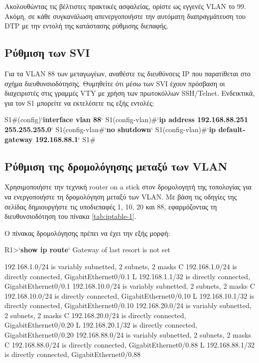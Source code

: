 \documentclass{EdipyLabs} %
\begin{document}
Ακολουθώντας τις βέλτιστες πρακτικές ασφαλείας, ορίστε ως εγγενές VLAN το 99. Ακόμη, σε κάθε συγκανάλωση απενεργοποιήστε την αυτόματη διαπραγμάτευση του DTP με την εντολή  της κατάστασης ρύθμισης διεπαφής.


\subsection{Ρύθμιση των SVI}
Για τα VLAN 88 των μεταγωγέων, αναθέστε τις διευθύνσεις IP που παρατίθεται στο σχήμα διευθυνσιοδότησης. Θυμηθείτε ότι μέσω των SVI έχουν πρόσβαση οι διαχειριστές στις γραμμές VTY με χρήση των πρωτοκόλλων SSH/Telnet. Ενδεικτικά, για τον S1 μπορείτε να εκτελέσετε τις εξής εντολές:

\begin{CommandBox}
S1#(config)`\textbf{interface vlan 88}`
S1(config-vlan)#`\textbf{ip address 192.168.88.251 255.255.255.0}`
S1(config-vlan#`\textbf{no shutdown}`
S1(config-vlan)#`\textbf{ip default-gateway 192.168.88.1}`
S1#
\end{CommandBox}

\subsection{Ρύθμιση της δρομολόγησης μεταξύ των VLAN}
Χρησιμοποιήστε την τεχνική router on a stick στον δρομολογητή της τοπολογίας για να ενεργοποιήστε τη δρομολόγηση μεταξύ των VLAN. Με βάση τις οδηγίες της σελίδας \pageref{inter-vlan} δημιουργήστε τις υποδιεπαφές 1, 10, 20 και 88, εφαρμόζοντας τη διευθυνσιοδότηση του πίνακα \ref{tab:iptable-1}.

Ο πίνακας δρομολόγησης πρέπει να έχει την εξής μορφή:

\begin{CommandBox}
R1>`\textbf{show ip route}`
Gateway of last resort is not set

     192.168.1.0/24 is variably subnetted, 2 subnets, 2 masks
C       192.168.1.0/24 is directly connected, GigabitEthernet0/0.1
L       192.168.1.1/32 is directly connected, GigabitEthernet0/0.1
     192.168.10.0/24 is variably subnetted, 2 subnets, 2 masks
C        192.168.10.0/24 is directly connected, GigabitEthernet0/0.10
L       192.168.10.1/32 is directly connected, GigabitEthernet0/0.10
     192.168.20.0/24 is variably subnetted, 2 subnets, 2 masks
C       192.168.20.0/24 is directly connected, GigabitEthernet0/0.20
L       192.168.20.1/32 is directly connected, GigabitEthernet0/0.20
     192.168.88.0/24 is variably subnetted, 2 subnets, 2 masks
C       192.168.88.0/24 is directly connected, GigabitEthernet0/0.88
L       192.168.88.1/32 is directly connected, GigabitEthernet0/0.88
\end{CommandBox} 
\end{document}
